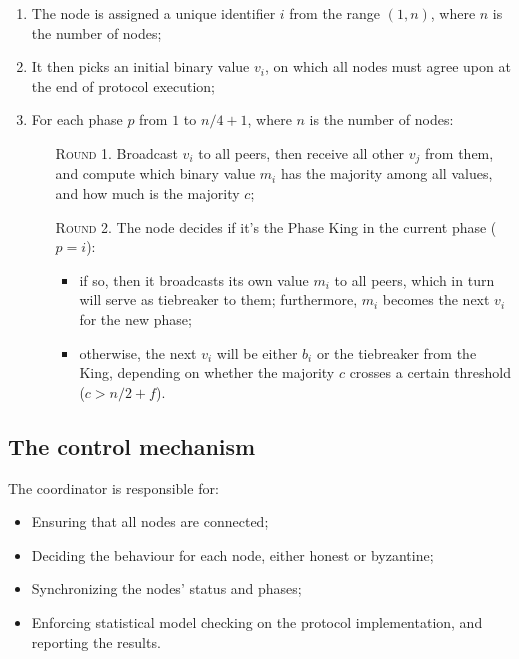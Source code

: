 \documentclass{article}
\begin{document}
    \begin{enumerate}
        \item The node is assigned a unique identifier $i$ from the range $(1, n)$, where $n$ is the number of nodes;
        
        \item It then picks an initial binary value $v_i$, on which all nodes must agree upon at the end of protocol execution;

        \item For each phase $p$ from $1$ to $n/4 + 1$, where $n$ is the number of nodes:

        \begin{enumerate}
            \item[\textsc{Round 1}.] Broadcast $v_i$ to all peers, then receive all other $v_j$ from them, and compute which binary value $m_i$ has the majority among all values, and how much is the majority $c$;
            \item[\textsc{Round 2}.] The node decides if it's the Phase King in the current phase ($p = i$):

            \begin{itemize}
                \item if so, then it broadcasts its own value $m_i$ to all peers, which in turn will serve as tiebreaker to them; furthermore, $m_i$ becomes the next $v_i$ for the new phase;
                \item otherwise, the next $v_i$ will be either $b_i$ or the tiebreaker from the King, depending on whether the majority $c$ crosses a certain threshold ($c > n / 2 + f$).
            \end{itemize}

        \end{enumerate}

    \end{enumerate}


    \subsection{The control mechanism}

    The coordinator is responsible for:

    \begin{itemize}
        \item Ensuring that all nodes are connected;
        \item Deciding the behaviour for each node, either honest or byzantine;
        \item Synchronizing the nodes' status and phases;
        \item Enforcing statistical model checking on the protocol implementation, and reporting the results.
    \end{itemize}
\end{document}
